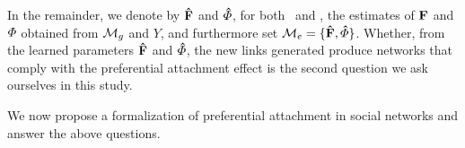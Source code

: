 In the remainder, we denote by $\mathbf{\hat{F}}$ and $\mat{\hat{\Phi}}$, for both \ifm\ and \imb, the estimates of $\mathbf{F}$ and $\mat{\Phi}$ obtained from $\mathcal{M}_g$ and $Y$, and furthermore set $\me = \{\mat{\hat{F}},\mat{\hat{\Phi}}\}$. Whether, from the learned parameters $\mathbf{\hat{F}}$ and $\mat{\hat{\Phi}}$, the new links generated produce networks that comply with the preferential attachment effect is the second question we ask ourselves in this study.

We now propose a formalization of preferential attachment in social networks and answer the above questions.

